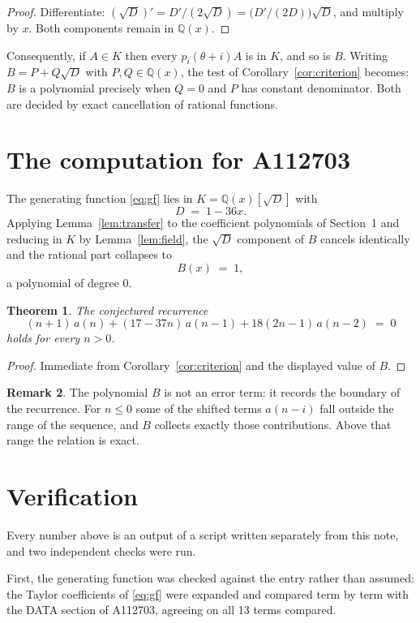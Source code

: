 \documentclass[11pt,a4paper]{article}
\theoremstyle{plain}
\newtheorem{theorem}{Theorem}
\theoremstyle{definition}
\newtheorem{remark}[theorem]{Remark}
\begin{document}
\begin{proof}
Differentiate: $(\sqrt{D})'=D'/(2\sqrt{D})=\bigl(D'/(2D)\bigr)\sqrt{D}$, and multiply by
$x$. Both components remain in $\mathbb{Q}(x)$.
\end{proof}

Consequently, if $A\in K$ then every $p_{i}(\theta+i)A$ is in $K$, and so is $B$. Writing
$B=P+Q\sqrt{D}$ with $P,Q\in\mathbb{Q}(x)$, the test of Corollary~\ref{cor:criterion}
becomes: $B$ is a polynomial precisely when $Q=0$ and $P$ has constant denominator. Both
are decided by exact cancellation of rational functions.

\section{The computation for A112703}

The generating function \eqref{eq:gf} lies in $K=\mathbb{Q}(x)[\sqrt{D}]$ with
\[
D \;=\; 1 - 36 x .
\]
Applying Lemma~\ref{lem:transfer} to the coefficient polynomials of Section~1 and reducing
in $K$ by Lemma~\ref{lem:field}, the $\sqrt{D}$ component of $B$ cancels identically and
the rational part collapses to
\[
B(x)\;=\;1 ,
\]
a polynomial of degree $0$.

\begin{theorem}
The conjectured recurrence
\[
(n + 1)\,a(n) + (17 - 37 n)\,a(n-1) + 18 \left(2 n - 1\right)\,a(n-2) \;=\;0
\]
holds for every $n>0$.
\end{theorem}

\begin{proof}
Immediate from Corollary~\ref{cor:criterion} and the displayed value of $B$.
\end{proof}

\begin{remark}
The polynomial $B$ is not an error term: it records the boundary of the recurrence. For
$n\le0$ some of the shifted terms $a(n-i)$ fall outside the range of the sequence,
and $B$ collects exactly those contributions. Above that range the relation is exact.
\end{remark}

\section{Verification}

Every number above is an output of a script written separately from this note, and two
independent checks were run.

First, the generating function was checked against the entry rather than assumed: the
Taylor coefficients of \eqref{eq:gf} were expanded and compared term by term with the DATA
section of A112703, agreeing on all 13 terms compared.
\end{document}
